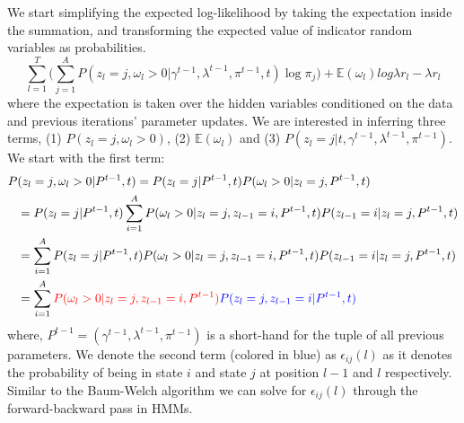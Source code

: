 We start simplifying the expected log-likelihood by taking the expectation inside the summation, and transforming the expected value of indicator random variables as probabilities. 
\begin{equation}
     \sum\limits_{l=1}^{T} \Big( \sum\limits_{j=1}^{A} P(z_l = j, \omega_l > 0 \vert \gamma^{t-1}, \lambda^{t-1}, \pi^{t-1}, t) \log \pi_j \Big) + \mathbb{E}(\omega_l) log \lambda r_l - \lambda r_l
\end{equation}
where the expectation is taken over the hidden variables conditioned on the data and previous iterations' parameter updates. We are interested in inferring three terms, (1) $P(z_l = j, \omega_l > 0)$, (2) $\mathbb{E}(\omega_l)$ and (3) $P(z_l = j \vert t, \gamma^{t-1}, \lambda^{t-1}, \pi^{t-1})$. We start with the first term:
\begin{align}
    P&(z_l = j, \omega_l > 0 \vert P^{t-1}, t) = P(z_l = j \vert P^{t-1}, t) P(\omega_l > 0 \vert z_l = j, P^{t-1}, t) \nonumber \\
    &= P(z_l = j \vert P^{t-1}, t) \sum\limits_{i=1}^{A} P(\omega_l > 0 \vert z_l = j, z_{l-1} = i, P^{t-1}, t) P(z_{l-1} = i \vert z_l = j, P^{t-1}, t) \nonumber \\
    &= \sum\limits_{i=1}^{A} P(z_l = j \vert P^{t-1}, t) P(\omega_l > 0 \vert z_l = j, z_{l-1} = i, P^{t-1}, t) P(z_{l-1} = i \vert z_l = j, P^{t-1}, t) \nonumber \\
    &= \sum\limits_{i=1}^{A} \color{red}{P(\omega_l > 0 \vert z_l = j, z_{l-1} = i, P^{t-1})} \color{blue}{P(z_l = j, z_{l-1} = i \vert P^{t-1}, t)}
\label{eq:hmm_estep}
\end{align}
where, $P^{t-1} = (\gamma^{t-1}, \lambda^{t-1}, \pi^{t-1})$ is a short-hand for the tuple of all previous parameters. We denote the second term (colored in blue) as $\epsilon_{ij}(l)$ as it denotes the probability of being in state $i$ and state $j$ at position $l-1$ and $l$ respectively. Similar to the Baum-Welch algorithm we can solve for $\epsilon_{ij}(l)$ through the forward-backward pass in HMMs. 

